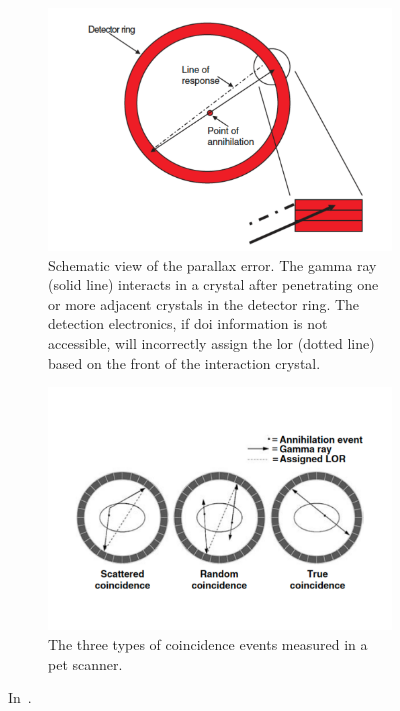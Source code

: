 \begin{figure}[!htbp]
\begin{subfigure}[t]{.49\textwidth}
\centering
\includegraphics[width=0.7\linewidth]{03_GraphicFiles/chapter1_Introduction/PET_parallax.pdf}
\caption{Schematic view of the parallax error. The gamma ray (solid line) interacts in a crystal after penetrating one or more adjacent crystals in the detector ring. The detection electronics, if \gls{doi} information is not accessible, will incorrectly assign the \gls{lor} (dotted line) based on the front of the interaction crystal.}
\label{chap1::fig::PET_parallax}
\end{subfigure}
\begin{subfigure}[t]{.49\textwidth}
\centering
\includegraphics[width=0.98\linewidth]{03_GraphicFiles/chapter1_Introduction/PET_events.pdf}
\caption{The three types of coincidence events measured in a \gls{pet} scanner.}
\label{chap1::fig::PET_events}
\end{subfigure}
\caption{In~\cite{Lewellen2004}.}
\label{chap1::fig::PET_details}
\end{figure} 

